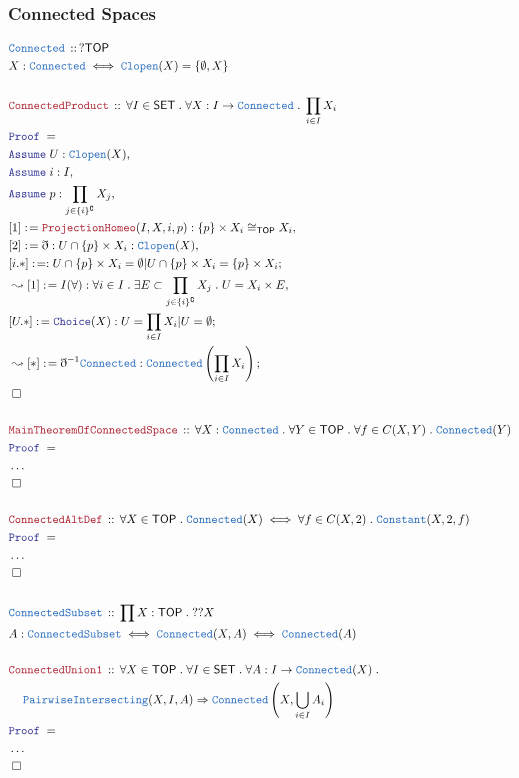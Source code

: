 \documentclass[12pt]{scrartcl}
\newcommand{\TYPE}[1]{\textcolor{NavyBlue}{\mathtt{#1}}}
\newcommand{\LOGIC}[1]{\textcolor{Blue}{\mathtt{#1}}}
\newcommand{\THM}[1]{\textcolor{Maroon}{\mathtt{#1}}}
\renewcommand{\.}{\; . \;}
\newcommand{\de}{: \kern 0.1pc =}
\newcommand{\Theorem}[2]{& \THM{#1} \, :: \, #2 \\ & \Proof = \\ }
\newcommand{\DeclareType}[2]{& \TYPE{#1} \, :: \, #2 \\}
\newcommand{\DefineType}[3]{& #1 : \TYPE{#2} \iff #3 \\}
\newcommand{\DefineNamedType}[4]{& #1 : \TYPE{#2} \iff #3 \iff #4 \\}
\newcommand{\NewLine}{\\ & \kern 1pc}
\newcommand{\Page}[1]{ \begin{align*} #1 \end{align*}   }
\newcommand{ \bd }{ \ByDef }
\newcommand{\NoProof}{ & \ldots \\ \EndProof}
\newcommand{\Imply}{\Rightarrow}
\renewcommand{\c}{\complement}
\newcommand{\Say}[3]{& #1 \de #2 : #3, \\}
\newcommand{\Conclude}[3]{& #1 \de #2 : #3; \\}
\newcommand{\Derive}[3]{& \leadsto #1 \de #2 : #3, \\}
\newcommand{\DeriveConclude}[3]{& \leadsto #1 \de #2 : #3 ; \\}
\newcommand{\Assume}[2]{& \LOGIC{Assume} \; #1 : #2, \\}
\newcommand{\QED}{\; \square}
\newcommand{\EndProof}{& \QED \\}
\newcommand{\ByDef}{\eth}
\newcommand{\Proof}{\LOGIC{Proof} \; }
\newcommand{\SET}{\mathsf{SET}}
\newcommand{\TOP}{\mathsf{TOP}}
\begin{document}
\subsubsection{Connected Spaces}
\Page{
	\DeclareType{Connected}{?\TOP}
	\DefineType{X}{Connected}{\TYPE{Clopen}(X) = \{ \emptyset, X \}}
	\\
	\Theorem{ConnectedProduct}{\forall I \in \SET \. \forall X : I \to \TYPE{Connected} \. \prod_{i \in I} X_i }
	\Assume{U}{\TYPE{Clopen}(X)}
	\Assume{i}{I}
	\Assume{p}{\prod_{j \in \{i\}^\c} X_j}
	\Say{[1]}{\THM{ProjectionHomeo}(I,X,i,p)}{ \{p\} \times X_i \cong_{\TOP} X_i  }
	\Say{[2]}{\bd  }{ U \cap \{p\} \times X_i  : \TYPE{Clopen}(X)  }
	\Conclude{[i.*]}{  }{ U \cap \{p\} \times X_i  = \emptyset |  U \cap \{p\} \times X_i  = \{p\} \times X_i  }
	\Derive{[1]}{I(\forall)}{ \forall i \in I \. \exists E \subset  \prod_{j \in \{i\}^\c} X_j \.  U = X_i \times E  }
	\Conclude{[U.*]}{\LOGIC{Choice}(X)}{ U = \prod_{i \in I} X_i  | U = \emptyset}
	\DeriveConclude{[*]}{\bd^{-1}\TYPE{Connected}}{\TYPE{Connected}\left(\prod_{i \in I} X_i\right)}
	\EndProof
	\\
	\Theorem{MainTheoremOfConnectedSpace}{\forall X : \TYPE{Connected} \. \forall Y \in \TOP \. \forall f \in C(X,Y) \. \TYPE{Connected}(Y)}
	\NoProof
	\\
	\Theorem{ConnectedAltDef}{\forall X \in \TOP \. \TYPE{Connected}(X) \iff \forall f \in C(X,2) \.  \TYPE{Constant}(X,2,f)}
	\NoProof
	\\
	\DeclareType{ConnectedSubset}{\prod X : \TOP \. ??X}
	\DefineNamedType{A}{ConnectedSubset}{\TYPE{Connected}(X,A)}{\TYPE{Connected}(A)}
	\\
	\Theorem{ConnectedUnion1}{\forall X \in \TOP \. \forall I \in \SET \. \forall A : I \to \TYPE{Connected}(X) \. \NewLine \TYPE{PairwiseIntersecting}(X,I,A) \Imply \TYPE{Connected}\left(X,\bigcup_{i \in I} A_i \right)}
	\NoProof
}
\end{document}
